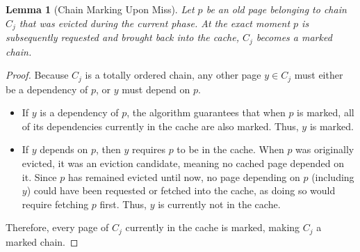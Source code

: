 \documentclass[a4paper]{article}
\newtheorem{lemma}{Lemma}      %
\begin{document}
\begin{lemma}[Chain Marking Upon Miss]
\label{lemma:chain_marking}
Let $p$ be an old page belonging to chain $C_j$ that was evicted during the current phase. At the exact moment $p$ is subsequently requested and brought back into the cache, $C_j$ becomes a marked chain.
\end{lemma}
\begin{proof}
Because $C_j$ is a totally ordered chain, any other page $y \in C_j$ must either be a dependency of $p$, or $y$ must depend on $p$.
\begin{itemize}
    \item If $y$ is a dependency of $p$, the algorithm guarantees that when $p$ is marked, all of its dependencies currently in the cache are also marked. Thus, $y$ is marked.
    \item If $y$ depends on $p$, then $y$ requires $p$ to be in the cache. When $p$ was originally evicted, it was an eviction candidate, meaning no cached page depended on it. Since $p$ has remained evicted until now, no page depending on $p$ (including $y$) could have been requested or fetched into the cache, as doing so would require fetching $p$ first. Thus, $y$ is currently not in the cache.
\end{itemize}
Therefore, every page of $C_j$ currently in the cache is marked, making $C_j$ a marked chain.
\end{proof}
\end{document}
